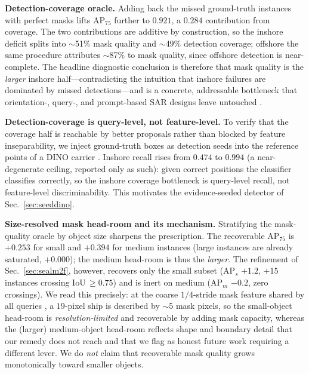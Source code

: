 \textbf{Detection-coverage oracle.} Adding back the missed ground-truth instances with perfect masks lifts AP$_{75}$ further to $0.921$, a $0.284$ contribution from coverage. The two contributions are additive by construction, so the inshore deficit splits into $\sim$51\% mask quality and $\sim$49\% detection coverage; offshore the same procedure attributes $\sim$87\% to mask quality, since offshore detection is near-complete. The headline diagnostic conclusion is therefore that mask quality is the \emph{larger} inshore half---contradicting the intuition that inshore failures are dominated by missed detections---and is a concrete, addressable bottleneck that orientation-, query-, and prompt-based SAR designs leave untouched \cite{gao2025o2former,xu2025diffsarshipinst,zheng2024mcsamseg}.

\textbf{Detection-coverage is query-level, not feature-level.} To verify that the coverage half is reachable by better proposals rather than blocked by feature inseparability, we inject ground-truth boxes as detection seeds into the reference points of a DINO carrier \cite{zhang2023dino}. Inshore recall rises from $0.474$ to $0.994$ (a near-degenerate ceiling, reported only as such): given correct positions the classifier classifies correctly, so the inshore coverage bottleneck is query-level recall, not feature-level discriminability. This motivates the evidence-seeded detector of Sec.~\ref{sec:seeddino}.

\textbf{Size-resolved mask head-room and its mechanism.} Stratifying the mask-quality oracle by object size sharpens the prescription. The recoverable AP$_{75}$ is $+0.253$ for small and $+0.394$ for medium instances (large instances are already saturated, $+0.000$); the medium head-room is thus the \emph{larger}. The refinement of Sec.~\ref{sec:sealm2f}, however, recovers only the small subset (AP$_s$ $+1.2$, $+15$ instances crossing IoU$\,\ge\!0.75$) and is inert on medium (AP$_m$ $-0.2$, zero crossings). We read this precisely: at the coarse $1/4$-stride mask feature shared by all queries \cite{cheng2022mask2former}, a $19$-pixel ship is described by $\sim$5 mask pixels, so the small-object head-room is \emph{resolution-limited} and recoverable by adding mask capacity, whereas the (larger) medium-object head-room reflects shape and boundary detail that our remedy does not reach and that we flag as honest future work requiring a different lever. We do \emph{not} claim that recoverable mask quality grows monotonically toward smaller objects.

